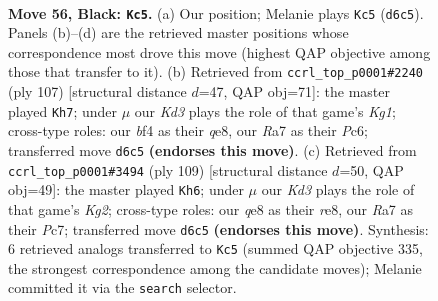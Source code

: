 \documentclass[11pt]{article}
\begin{document}
\clearpage

\begin{figure}[p]\centering
\begin{subfigure}{0.46\textwidth}\centering
\resizebox{\linewidth}{!}{%
\newchessgame
\chessboard[
  setfen={1qb1Q3/r7/3k4/p2p1p2/P4B1P/8/8/RN4K1 b - - 3 56},
  showmover=false,
  pgfstyle=straightmove, color=movearrow, markmove={d6-c5}
]}
\caption{}
\end{subfigure}\hfill
\begin{subfigure}{0.46\textwidth}\centering
\resizebox{\linewidth}{!}{%
\newchessgame
\chessboard[
  setfen={4Q1k1/4b1p1/2p5/4q2P/p2p4/7K/P5P1/2B5 b - - 7 54},
  showmover=false,
  pgfstyle=straightmove, color=movearrow, markmove={g8-h7}
]}
\caption{}
\end{subfigure}
\\[4pt]
\begin{subfigure}{0.46\textwidth}\centering
\resizebox{\linewidth}{!}{%
\newchessgame
\chessboard[
  setfen={4R3/2pq2k1/5b2/2p2r2/2N3Q1/1pP5/6P1/1K6 b - - 1 55},
  showmover=false,
  pgfstyle=straightmove, color=movearrow, markmove={g7-h6}
]}
\caption{}
\end{subfigure}\hfill

\caption{\textbf{Move 56, Black: \texttt{Kc5}.} (a) Our position; Melanie plays \texttt{Kc5} (\texttt{d6c5}). Panels (b)--(d) are the retrieved master positions whose correspondence most drove this move (highest QAP objective among those that transfer to it). (b) Retrieved from \texttt{ccrl\_top\_p0001\#2240} (ply 107) [structural distance $d$=47, QAP obj=71]: the master played \texttt{Kh7}; under $\mu$ our \emph{Kd3} plays the role of that game's \emph{Kg1}; cross-type roles: our \emph{b}f4 as their \emph{q}e8, our \emph{R}a7 as their \emph{P}c6; transferred move \texttt{d6c5} \textbf{(endorses this move)}. (c) Retrieved from \texttt{ccrl\_top\_p0001\#3494} (ply 109) [structural distance $d$=50, QAP obj=49]: the master played \texttt{Kh6}; under $\mu$ our \emph{Kd3} plays the role of that game's \emph{Kg2}; cross-type roles: our \emph{q}e8 as their \emph{r}e8, our \emph{R}a7 as their \emph{P}c7; transferred move \texttt{d6c5} \textbf{(endorses this move)}. Synthesis: 6 retrieved analogs transferred to \texttt{Kc5} (summed QAP objective 335, the strongest correspondence among the candidate moves); Melanie committed it via the \texttt{search} selector.}
\label{fig:thought-m111}
\end{figure}

\clearpage
\end{document}
